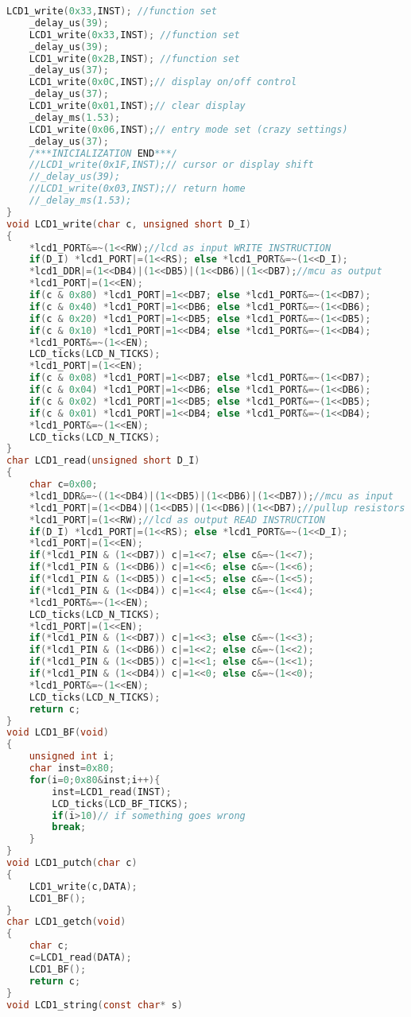 \begin{lstlisting}[language=C, caption={lcd.c}, label=lcd-c, captionpos=b]
	LCD1_write(0x33,INST); //function set
	_delay_us(39);
	LCD1_write(0x33,INST); //function set
	_delay_us(39);
	LCD1_write(0x2B,INST); //function set
	_delay_us(37);
	LCD1_write(0x0C,INST);// display on/off control
	_delay_us(37);
	LCD1_write(0x01,INST);// clear display
	_delay_ms(1.53);
	LCD1_write(0x06,INST);// entry mode set (crazy settings)
	_delay_us(37);
	/***INICIALIZATION END***/
	//LCD1_write(0x1F,INST);// cursor or display shift
	//_delay_us(39);
	//LCD1_write(0x03,INST);// return home
	//_delay_ms(1.53);
}
void LCD1_write(char c, unsigned short D_I)
{
	*lcd1_PORT&=~(1<<RW);//lcd as input WRITE INSTRUCTION
	if(D_I) *lcd1_PORT|=(1<<RS); else *lcd1_PORT&=~(1<<D_I);
	*lcd1_DDR|=(1<<DB4)|(1<<DB5)|(1<<DB6)|(1<<DB7);//mcu as output
	*lcd1_PORT|=(1<<EN);
	if(c & 0x80) *lcd1_PORT|=1<<DB7; else *lcd1_PORT&=~(1<<DB7);
	if(c & 0x40) *lcd1_PORT|=1<<DB6; else *lcd1_PORT&=~(1<<DB6);
	if(c & 0x20) *lcd1_PORT|=1<<DB5; else *lcd1_PORT&=~(1<<DB5);
	if(c & 0x10) *lcd1_PORT|=1<<DB4; else *lcd1_PORT&=~(1<<DB4);
	*lcd1_PORT&=~(1<<EN);
	LCD_ticks(LCD_N_TICKS);
	*lcd1_PORT|=(1<<EN);
	if(c & 0x08) *lcd1_PORT|=1<<DB7; else *lcd1_PORT&=~(1<<DB7);
	if(c & 0x04) *lcd1_PORT|=1<<DB6; else *lcd1_PORT&=~(1<<DB6);
	if(c & 0x02) *lcd1_PORT|=1<<DB5; else *lcd1_PORT&=~(1<<DB5);
	if(c & 0x01) *lcd1_PORT|=1<<DB4; else *lcd1_PORT&=~(1<<DB4);
	*lcd1_PORT&=~(1<<EN);
	LCD_ticks(LCD_N_TICKS);
}
char LCD1_read(unsigned short D_I)
{
	char c=0x00;
	*lcd1_DDR&=~((1<<DB4)|(1<<DB5)|(1<<DB6)|(1<<DB7));//mcu as input
	*lcd1_PORT|=(1<<DB4)|(1<<DB5)|(1<<DB6)|(1<<DB7);//pullup resistors
	*lcd1_PORT|=(1<<RW);//lcd as output READ INSTRUCTION
	if(D_I) *lcd1_PORT|=(1<<RS); else *lcd1_PORT&=~(1<<D_I);
	*lcd1_PORT|=(1<<EN);
	if(*lcd1_PIN & (1<<DB7)) c|=1<<7; else c&=~(1<<7);
	if(*lcd1_PIN & (1<<DB6)) c|=1<<6; else c&=~(1<<6);
	if(*lcd1_PIN & (1<<DB5)) c|=1<<5; else c&=~(1<<5);
	if(*lcd1_PIN & (1<<DB4)) c|=1<<4; else c&=~(1<<4);
	*lcd1_PORT&=~(1<<EN);
	LCD_ticks(LCD_N_TICKS);
	*lcd1_PORT|=(1<<EN);
	if(*lcd1_PIN & (1<<DB7)) c|=1<<3; else c&=~(1<<3);
	if(*lcd1_PIN & (1<<DB6)) c|=1<<2; else c&=~(1<<2);
	if(*lcd1_PIN & (1<<DB5)) c|=1<<1; else c&=~(1<<1);
	if(*lcd1_PIN & (1<<DB4)) c|=1<<0; else c&=~(1<<0);
	*lcd1_PORT&=~(1<<EN);
	LCD_ticks(LCD_N_TICKS);
	return c;
}
void LCD1_BF(void)
{
	unsigned int i;
	char inst=0x80;
	for(i=0;0x80&inst;i++){
		inst=LCD1_read(INST);
		LCD_ticks(LCD_BF_TICKS);
		if(i>10)// if something goes wrong
		break;
	}
}
void LCD1_putch(char c)
{
	LCD1_write(c,DATA);
	LCD1_BF();
}
char LCD1_getch(void)
{
	char c;
	c=LCD1_read(DATA);
	LCD1_BF();
	return c;
}
void LCD1_string(const char* s)

\end{lstlisting}
